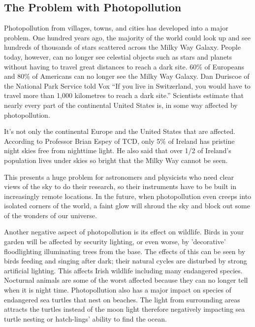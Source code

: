 \subsection{The Problem with Photopollution}
Photopollution from villages, towns, and cities has developed into a major problem. One hundred years ago, the majority of the world could look up and see hundreds of thousands of stars scattered across the Milky Way Galaxy. People today, however, can no longer see celestial objects such as stars and planets without having to travel great distances to reach a dark site. 60\% of Europeans and 80\% of Americans can no longer see the Milky Way Galaxy. Dan Duriscoe of the National Park Service told Vox “If you live in Switzerland, you would have to travel more than 1,000 kilometres to reach a dark site.” Scientists estimate that nearly every part of the continental United States is, in some way affected by photopollution.\cite{vox}

It’s not only the continental Europe and the United States that are affected. According to Professor Brian Espey of TCD, only 5\% of Ireland has pristine night skies free from nighttime light. He also said that over 1/2 of Ireland’s population lives under skies so bright that the Milky Way cannot be seen.\cite{irishtimes}

This presents a huge problem for astronomers and physicists who need clear views of the sky to do their research, so their instruments have to be built in increasingly remote locations. In the future, when  photopollution even creeps into isolated corners of the world, a faint glow will shroud the sky and block out some of the wonders of our universe.\cite{vox}

Another negative aspect of photopollution is its effect on wildlife. Birds in your garden will be affected by security lighting, or even worse, by 'decorative' floodlighting illuminating trees from the base. The effects of this can be seen by birds feeding and singing after dark; their natural cycles are disturbed by strong artificial lighting.\cite{prob}
This affects Irish wildlife including many endangered species. Nocturnal animals are some of the worst affected because they can no longer tell when it is night time. Photopollution also has a major impact on species of endangered sea turtles that nest on beaches. The light from surrounding areas attracts the turtles instead of the moon light therefore negatively impacting sea turtle nesting or hatch-lings' ability to find the ocean.\cite{turtles}

